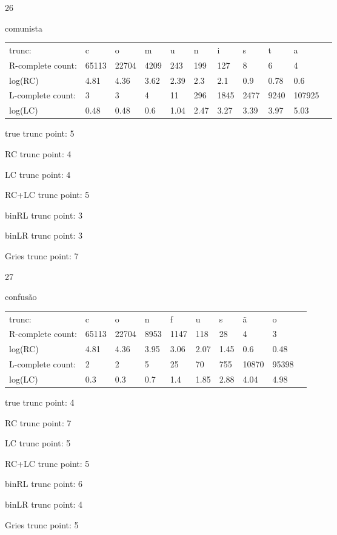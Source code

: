 \documentclass[10pt]{article}
\begin{document}
26

comunista

\begin{tabular}{l|llllllllll}
trunc: & c & o & m & u & n & i & s & t & a & \\ 
R-complete count: & 65113 & 22704 & 4209 & 243 & 199 & 127 & 8 & 6 & 4 & \\ 
log(RC) & 4.81 & 4.36 & 3.62 & 2.39 & 2.3 & 2.1 & 0.9 & 0.78 & 0.6 & \\ 
L-complete count: & 3 & 3 & 4 & 11 & 296 & 1845 & 2477 & 9240 & 107925 & \\ 
log(LC) & 0.48 & 0.48 & 0.6 & 1.04 & 2.47 & 3.27 & 3.39 & 3.97 & 5.03 & \\ 
\end{tabular}

true trunc point: 5

RC trunc point: 4

LC trunc point: 4

RC+LC trunc point: 5

binRL trunc point: 3

binLR trunc point: 3

Gries trunc point: 7

\vspace{1em}

27

confusão

\begin{tabular}{l|lllllllll}
trunc: & c & o & n & f & u & s & ã & o & \\ 
R-complete count: & 65113 & 22704 & 8953 & 1147 & 118 & 28 & 4 & 3 & \\ 
log(RC) & 4.81 & 4.36 & 3.95 & 3.06 & 2.07 & 1.45 & 0.6 & 0.48 & \\ 
L-complete count: & 2 & 2 & 5 & 25 & 70 & 755 & 10870 & 95398 & \\ 
log(LC) & 0.3 & 0.3 & 0.7 & 1.4 & 1.85 & 2.88 & 4.04 & 4.98 & \\ 
\end{tabular}

true trunc point: 4

RC trunc point: 7

LC trunc point: 5

RC+LC trunc point: 5

binRL trunc point: 6

binLR trunc point: 4

Gries trunc point: 5

\vspace{1em}
\end{document}
